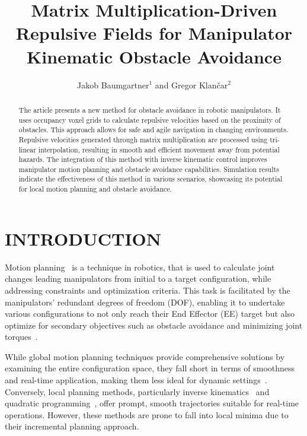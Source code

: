 \documentclass[letterpaper, 10 pt, conference]{ieeeconf}  %
\title{\LARGE \bf
Matrix Multiplication-Driven Repulsive Fields for Manipulator Kinematic Obstacle Avoidance
}
\author{
	Jakob Baumgartner$^{1}$ and Gregor Klančar$^{2}$%
}
\begin{document}
\maketitle
\thispagestyle{empty}
\pagestyle{empty}


\begin{abstract}

The article presents a new method for obstacle avoidance in robotic manipulators. It uses occupancy voxel grids to calculate repulsive velocities based on the proximity of obstacles. This approach allows for safe and agile navigation in changing environments. Repulsive velocities generated through matrix multiplication are processed using tri-linear interpolation, resulting in smooth and efficient movement away from potential hazards. The integration of this method with inverse kinematic control improves manipulator motion planning and obstacle avoidance capabilities. Simulation results indicate the effectiveness of this method in various scenarios, showcasing its potential for local motion planning and obstacle avoidance.

\end{abstract}

\section{INTRODUCTION}

Motion planning~\cite{c52} is a technique in robotics, that is used to calculate joint changes leading manipulators from initial to a target configuration, while addressing constraints and optimization criteria. This task is facilitated by the manipulators' redundant degrees of freedom (DOF), enabling it to undertake various configurations to not only reach their End Effector (EE) target but also optimize for secondary objectives such as obstacle avoidance and minimizing joint torques~\cite{c30}.

While global motion planning techniques provide comprehensive solutions by examining the entire configuration space, they fall short in terms of smoothness and real-time application, making them less ideal for dynamic settings~\cite{c52}. Conversely, local planning methods, particularly inverse kinematics~\cite{c38} and quadratic programming~\cite{c21,c23, haviland2021neo}, offer prompt, smooth trajectories suitable for real-time operations. However, these methods are prone to fall into local minima due to their incremental planning approach.
\end{document}
